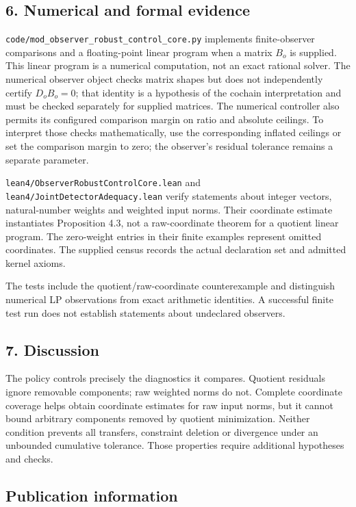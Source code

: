 \documentclass[
]{article}
\begin{document}
\subsection{6. Numerical and formal
evidence}\label{numerical-and-formal-evidence}

\nolinkurl{code/mod_observer_robust_control_core.py} implements
finite-observer comparisons and a floating-point linear program when a
matrix \(B_o\) is supplied. This linear program is a numerical
computation, not an exact rational solver. The numerical observer object
checks matrix shapes but does not independently certify \(D_oB_o=0\);
that identity is a hypothesis of the cochain interpretation and must be
checked separately for supplied matrices. The numerical controller also
permits its configured comparison margin on ratio and absolute ceilings.
To interpret those checks mathematically, use the corresponding inflated
ceilings or set the comparison margin to zero; the observer's residual
tolerance remains a separate parameter.

\nolinkurl{lean4/ObserverRobustControlCore.lean} and
\nolinkurl{lean4/JointDetectorAdequacy.lean} verify statements about
integer vectors, natural-number weights and weighted input norms. Their
coordinate estimate instantiates Proposition 4.3, not a raw-coordinate
theorem for a quotient linear program. The zero-weight entries in their
finite examples represent omitted coordinates. The supplied census
records the actual declaration set and admitted kernel axioms.

The tests include the quotient/raw-coordinate counterexample and
distinguish numerical LP observations from exact arithmetic identities.
A successful finite test run does not establish statements about
undeclared observers.

\subsection{7. Discussion}\label{discussion}

The policy controls precisely the diagnostics it compares. Quotient
residuals ignore removable components; raw weighted norms do not.
Complete coordinate coverage helps obtain coordinate estimates for raw
input norms, but it cannot bound arbitrary components removed by
quotient minimization. Neither condition prevents all transfers,
constraint deletion or divergence under an unbounded cumulative
tolerance. Those properties require additional hypotheses and checks.

\subsection{Publication information}\label{publication-information}
\end{document}
